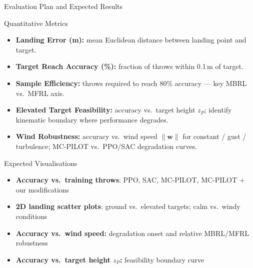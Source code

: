 \documentclass{if-beamer}
\begin{document}
\begin{frame}{Evaluation Plan and Expected Results}
    \begin{block}{Quantitative Metrics}
        \begin{itemize}
            \item \textbf{Landing Error (m):} mean Euclidean distance between landing point and target.
            \item \textbf{Target Reach Accuracy (\%):} fraction of throws within 0.1\,m of target.
            \item \textbf{Sample Efficiency:} throws required to reach 80\% accuracy --- key MBRL vs.\ MFRL axis.
            \item \textbf{Elevated Target Feasibility:} accuracy vs.\ target height $z_P$; identify kinematic boundary where performance degrades.
            \item \textbf{Wind Robustness:} accuracy vs.\ wind speed $\|\mathbf{w}\|$ for constant / gust / turbulence; MC-PILOT vs.\ PPO/SAC degradation curves.
        \end{itemize}
    \end{block}
    \begin{block}{Expected Visualisations}
        \begin{itemize}
            \item \textbf{Accuracy vs.\ training throws}: PPO, SAC, MC-PILOT, MC-PILOT + our modifications
            \item \textbf{2D landing scatter plots}: ground vs.\ elevated targets; calm vs.\ windy conditions
            \item \textbf{Accuracy vs.\ wind speed:} degradation onset and relative MBRL/MFRL robustness
            \item \textbf{Accuracy vs.\ target height $z_P$:} feasibility boundary curve
        \end{itemize}
    \end{block}
\end{frame}
\end{document}
